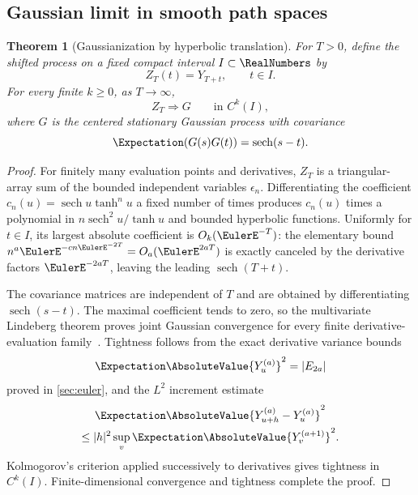 \documentclass[11pt,a4paper]{article}
\newtheorem{theorem}{Theorem}[section]
\theoremstyle{definition}
\theoremstyle{remark}
\newcommand{\sech}{\operatorname{sech}}
\begin{document}
\subsection{Gaussian limit in smooth path spaces}

\begin{theorem}[Gaussianization by hyperbolic translation]
\label{thm:gaussianization}
For $T>0$, define the shifted process on a fixed compact interval $I\subset\RealNumbers$ by
\begin{equation}
  Z_T(t)=Y_{T+t},\qquad t\in I.
\end{equation}
For every finite $k\ge0$, as $T\to\infty$,
\begin{equation}
  Z_T\Longrightarrow G
  \qquad\text{in }C^k(I),
  \label{eq:Ck-gaussianization}
\end{equation}
where $G$ is the centered stationary Gaussian process with covariance
\begin{equation}
  \Expectation(G(s)G(t))=\sech(s-t).
  \label{eq:Gaussian-sech}
\end{equation}
\end{theorem}

\begin{proof}
For finitely many evaluation points and derivatives, $Z_T$ is a triangular-array sum of the bounded independent variables $\epsilon_n$.  Differentiating the coefficient
$c_n(u)=\sech u\tanh^nu$ a fixed number of times produces $c_n(u)$ times a polynomial in $n\sech^2u/\tanh u$ and bounded hyperbolic functions.  Uniformly for $t\in I$, its largest absolute coefficient is $O_k(\EulerE^{-T})$: the elementary bound $n^a\EulerE^{-cn\EulerE^{-2T}}=O_a(\EulerE^{2aT})$ is exactly canceled by the derivative factors $\EulerE^{-2aT}$, leaving the leading $\sech(T+t)$.

The covariance matrices are independent of $T$ and are obtained by differentiating $\sech(s-t)$.  The maximal coefficient tends to zero, so the multivariate Lindeberg theorem proves joint Gaussian convergence for every finite derivative-evaluation family~\cite{Billingsley}.  Tightness follows from the exact derivative variance bounds
\begin{equation}
  \Expectation\AbsoluteValue{Y_u^{(a)}}^2=|E_{2a}|
  \label{eq:derivative-variance-preview}
\end{equation}
proved in \cref{sec:euler}, and the $L^2$ increment estimate
\begin{multline*}
  \Expectation\AbsoluteValue{Y_{u+h}^{(a)}-Y_u^{(a)}}^2
  \\
  \le |h|^2\sup_v\Expectation\AbsoluteValue{Y_v^{(a+1)}}^2.
\end{multline*}
Kolmogorov's criterion applied successively to derivatives gives tightness in $C^k(I)$.  Finite-dimensional convergence and tightness complete the proof.
\end{proof}
\end{document}
